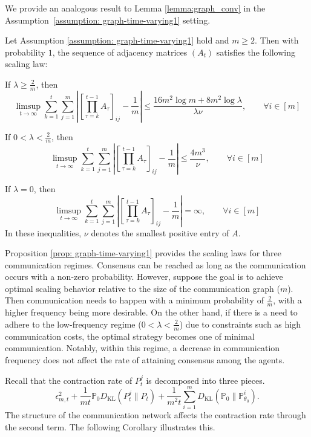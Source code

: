\documentclass[twoside,11pt]{article}
\numberwithin{equation}{section}
\newcommand\bP{\mathbb{P}}
\begin{document}
{We provide an analogous result to Lemma \ref{lemma:graph_conv} in the Assumption~\ref{assumption: graph-time-varying1} setting.
\begin{proposition}
\label{prop: graph-time-varying1}
Let Assumption \ref{assumption: graph-time-varying1} hold and $m \geq 2$. Then with probability $1$, the sequence of adjacency matrices $(A_t)$ satisfies the following scaling law: 

If $\lambda \geq \frac{2}{m}$, then
\begin{equation*}
   \limsup_{t \to \infty} \sum_{k = 1}^t \sum_{j = 1}^m \left|\left[\prod_{\tau = k}^{t-1}A_\tau \right]_{ij}- \frac{1}{m} \right| \leq  \frac{16 m^2 \log m + 8m^2 \log \lambda}{\lambda \nu}, \qquad \forall i \in [m]
\end{equation*}

If $0<\lambda < \frac{2}{m}$, then
\begin{equation*}
   \limsup_{t \to \infty} \sum_{k = 1}^t \sum_{j = 1}^m \left|\left[\prod_{\tau = k}^{t-1}A_\tau \right]_{ij}- \frac{1}{m} \right| \leq  \frac{4m^3}{\nu}, \qquad \forall i \in [m]
\end{equation*}

If $\lambda = 0$, then
\begin{equation*}
   \limsup_{t \to \infty} \sum_{k = 1}^t \sum_{j = 1}^m \left|\left[\prod_{\tau = k}^{t-1}A_\tau \right]_{ij}- \frac{1}{m} \right|= \infty, \qquad \forall i \in [m]
\end{equation*}
In these inequalities, $\nu$ denotes the smallest positive entry of $A$.
\end{proposition}

Proposition \ref{prop: graph-time-varying1} provides the scaling laws for three communication regimes.  Consensus can be reached as long as the communication occurs with a non-zero probability. However, suppose the goal is to achieve optimal scaling behavior relative to the size of the communication graph ($m$). Then communication needs to happen with a minimum probability of $\frac{2}{m}$, with a higher frequency being more desirable. On the other hand, if there is a need to adhere to the low-frequency regime ($0<\lambda < \frac{2}{m}$) due to constraints such as high communication costs, the optimal strategy becomes one of minimal communication. Notably, within this regime, a decrease in communication frequency does not affect the rate of attaining consensus among the agents.
    
 Recall that the contraction rate of $P_t^j$ is decomposed into three pieces. 
\begin{equation*}
    \epsilon_{m,t}^2 + \frac{1}{mt} \bP_0 D_{\text{KL}}(P_t^j \parallel P_t) + \frac{1}{m^2 t} \sum_{i = 1}^m D_{\text{KL}}(\bP_0 \parallel \bP_{\theta_0}^i).
\end{equation*}
 The structure of the communication network affects the contraction rate through the second term. The following Corollary illustrates this.

}
\end{document}
